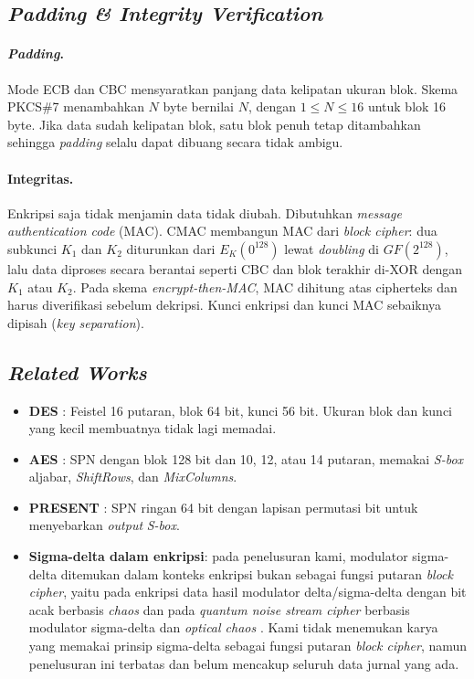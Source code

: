 \subsection{\textit{Padding \& Integrity Verification}}
\paragraph{\textit{Padding}.} Mode ECB dan CBC mensyaratkan panjang data kelipatan ukuran blok.
Skema PKCS\#7 \cite{rfc5652} menambahkan $N$ byte bernilai $N$, dengan $1 \le N \le 16$ untuk blok
16 byte. Jika data sudah kelipatan blok, satu blok penuh tetap ditambahkan sehingga \textit{padding}
selalu dapat dibuang secara tidak ambigu.

\paragraph{Integritas.} Enkripsi saja tidak menjamin data tidak diubah. Dibutuhkan
\textit{message authentication code} (MAC). CMAC \cite{rfc4493} membangun MAC dari \textit{block
cipher}: dua subkunci $K_1$ dan $K_2$ diturunkan dari $E_K(0^{128})$ lewat \textit{doubling} di
$GF(2^{128})$, lalu data diproses secara berantai seperti CBC dan blok terakhir di-XOR dengan
$K_1$ atau $K_2$. Pada skema \textit{encrypt-then-MAC}, MAC dihitung atas cipherteks dan harus
diverifikasi sebelum dekripsi. Kunci enkripsi dan kunci MAC sebaiknya dipisah (\textit{key
separation}).

\subsection{\textit{Related Works}}
\begin{itemize}
  \item \textbf{DES} \cite{des}: Feistel 16 putaran, blok 64 bit, kunci 56 bit. Ukuran blok dan
    kunci yang kecil membuatnya tidak lagi memadai.
  \item \textbf{AES} \cite{aes}: SPN dengan blok 128 bit dan 10, 12, atau 14 putaran, memakai
    \textit{S-box} aljabar, \textit{ShiftRows}, dan \textit{MixColumns}.
  \item \textbf{PRESENT} \cite{present}: SPN ringan 64 bit dengan lapisan permutasi bit untuk
    menyebarkan \textit{output} \textit{S-box}.
  \item \textbf{Sigma-delta dalam enkripsi}: pada penelusuran kami, modulator sigma-delta
    ditemukan dalam konteks enkripsi bukan sebagai fungsi putaran \textit{block cipher}, yaitu
    pada enkripsi data hasil modulator delta/sigma-delta dengan bit acak berbasis
    \textit{chaos} \cite{chaosdsm} dan pada \textit{quantum noise stream cipher} berbasis
    modulator sigma-delta dan \textit{optical chaos} \cite{qnsc}. Kami tidak menemukan karya yang
    memakai prinsip sigma-delta sebagai fungsi putaran \textit{block cipher}, namun
    penelusuran ini terbatas dan belum mencakup seluruh data jurnal yang ada.
\end{itemize}
